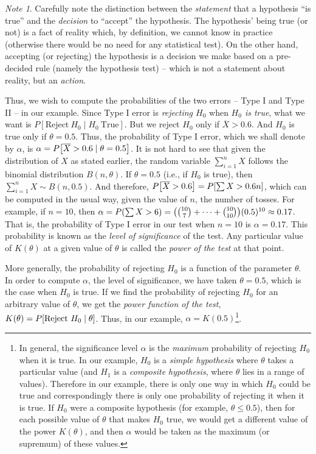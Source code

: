 \documentclass[svgnames, a5paper]{article}
\theoremstyle{definition}
\theoremstyle{remark}
\newtheorem*{Note*}{Note}
\begin{document}
{\scriptsize\color{blue!50!black}\begin{Note*}
Carefully note the distinction between the \emph{statement} that a hypothesis ``is true'' and the \emph{decision} to ``accept'' the hypothesis. The hypothesis' being true (or not) is a fact of reality which, by definition, we cannot know in practice (otherwise there would be no need for any statistical test). On the other hand, accepting (or rejecting) the hypothesis is a decision we make based on a pre-decided rule (namely the hypothesis test) -- which is not a statement about reality, but an \emph{action}.
\end{Note*}}

Thus, we wish to compute the probabilities of the two errors -- Type I and Type II -- in our example. Since Type I error is \emph{rejecting $H_0$} when \emph{$H_0$ is true}, what we want is $P[\text{Reject}\ H_0 \mid H_0\ \text{True}]$. But we reject $H_0$ only if $\overline X > 0.6$. And $H_0$ is true only if $\theta = 0.5$. Thus, the probability of Type I error, which we shall denote by $\alpha$, is $\alpha = P\bqty{\overline X > 0.6 \mid \theta = 0.5}$. It is not hard to see that given the distribution of $X$ as stated earlier, the random variable $\sum\limits_{i=1}^n X$ follows the binomial distribution $B(n, \theta)$. If $\theta = 0.5$ (i.e., if $H_0$ is true), then $\sum\limits_{i=1}^n X \sim B(n, 0.5)$. And therefore, $P\bqty{ \overline X > 0.6 } = P\bqty{ \sum X > 0.6n }$, which can be computed in the usual way, given the value of $n$, the number of tosses. For example, if $n = 10$, then $\alpha = P\pqty{ \sum X > 6 } = \pqty{\binom{10}{7} + \cdots + \binom{10}{10}}(0.5)^{10} \approx 0.17$. That is, the probability of Type I error in our test when $n = 10$ is $\alpha = 0.17$. This probability is known as the \emph{level of significance} of the test. Any particular value of $K(\theta)$ at a given value of $\theta$ is called the \emph{power of the test} at that point.

More generally, the probability of rejecting $H_0$ is a function of the parameter $\theta$. In order to compute $\alpha$, the level of significance, we have taken $\theta = 0.5$, which is the case when $H_0$ is true. If we find the probability of rejecting $H_0$ for an arbitrary value of $\theta$, we get the \emph{power function of the test}, $K(\theta) = P\bqty{ \text{Reject}\ H_0 \mid \theta }$. Thus, in our example, $\alpha = K(0.5)$\footnote{
	In general, the significance level $\alpha$ is the \emph{maximum} probability of rejecting $H_0$ when it is true. In our example, $H_0$ is a \emph{simple hypothesis} where $\theta$ takes a particular value (and $H_1$ is a \emph{composite hypothesis}, where $\theta$ lies in a range of values). Therefore in our example, there is only one way in which $H_0$ could be true and correspondingly there is only one probability of rejecting it when it is true. If $H_0$ were a composite hypothesis (for example, $\theta \le 0.5$), then for each possible value of $\theta$ that makes $H_0$ true, we would get a different value of the power $K(\theta)$, and then $\alpha$ would be taken as the maximum (or supremum) of these values.
}.
\end{document}
